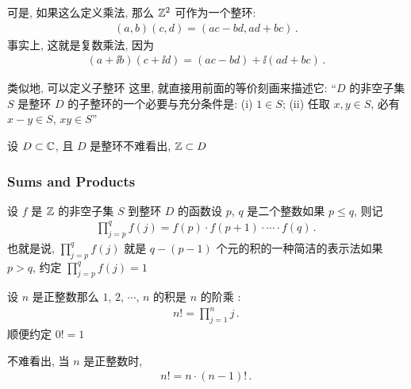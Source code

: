 \begin{remark}
    可是, 如果这么定义乘法, 那么 $\mathbb{Z}^2$ 可作为一个整环:
    \begin{align*}
        (a,b)(c,d) = (ac-bd,ad+bc)\period
    \end{align*}
    事实上, 这就是复数乘法, 因为
    \begin{align*}
        (a+ \ii b)(c+ \ii d) = (ac-bd) + \ii (ad+bc) \period
    \end{align*}
\end{remark}

\begin{remark}
    类似地, 可以定义子整环 \period 这里, 就直接用前面的等价刻画来描述它: ``$D$ 的非空子集 $S$ 是整环 $D$ 的子整环的一个必要与充分条件是: (i) $1 \in S$; (ii) 任取 $x,y \in S$, 必有 $x-y \in S$, $xy \in S$\period ''
\end{remark}

\begin{example}
    设 $D \subset \mathbb{C}$, 且 $D$ 是整环\period 不难看出, $\mathbb{Z} \subset D$\period
\end{example}

\subsubsection*{Sums and Products}

\begin{definition}
    设 $f$ 是 $\mathbb{Z}$ 的非空子集 $S$ 到整环 $D$ 的函数\period 设 $p$, $q$ 是二个整数\period 如果 $p \leq q$, 则记
    \begin{align*}
        \prod_{j = p}^{q} f(j) = f(p) \cdot f(p + 1) \cdot \cdots \cdot f(q)\period
    \end{align*}
    也就是说, $\prod_{j = p}^{q} f(j)$ 就是 $q - (p - 1)$ 个元的积的一种简洁的表示法\period 如果 $p > q$, 约定 $\prod_{j = p}^{q} f(j) = 1$\period
\end{definition}

\begin{definition}
    设 $n$ 是正整数\period 那么 $1$, $2$, $\cdots$, $n$ 的积是 $n$ 的阶乘 :
    \begin{align*}
        n! = \prod_{j = 1}^{n} j \period
    \end{align*}
    顺便约定 $0! = 1$\period
\end{definition}

\begin{remark}
    不难看出, 当 $n$ 是正整数时,
    \begin{align*}
        n! = n \cdot (n-1)! \period
    \end{align*}
\end{remark}

